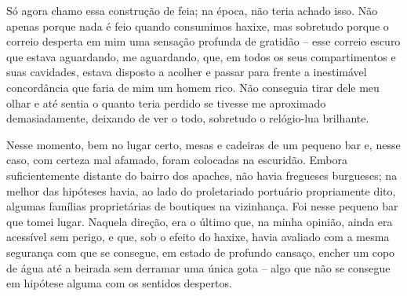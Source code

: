 Só agora chamo essa construção de feia; na época, não teria achado isso.
Não apenas porque nada é feio quando consumimos haxixe, mas sobretudo
porque o correio desperta em mim uma sensação profunda de gratidão --
esse correio escuro que estava aguardando, me aguardando, que, em todos
os seus compartimentos e suas cavidades, estava disposto a acolher e
passar para frente a inestimável concordância que faria de mim um homem
rico. Não conseguia tirar dele meu olhar e até sentia o quanto teria
perdido se tivesse me aproximado demasiadamente, deixando de ver o todo,
sobretudo o relógio-lua brilhante.

Nesse momento, bem no lugar certo, mesas e cadeiras de um pequeno bar e,
nesse caso, com certeza mal afamado, foram colocadas na escuridão.
Embora suficientemente distante do bairro dos apaches, não havia
fregueses burgueses; na melhor das hipóteses havia, ao lado do
proletariado portuário propriamente dito, algumas famílias proprietárias
de boutiques na vizinhança. Foi nesse pequeno bar que tomei lugar.
Naquela direção, era o último que, na minha opinião, ainda era acessível
sem perigo, e que, sob o efeito do haxixe, havia avaliado com a mesma
segurança com que se consegue, em estado de profundo cansaço, encher um
copo de água até a beirada sem derramar uma única gota -- algo que não
se consegue em hipótese alguma com os sentidos despertos.

